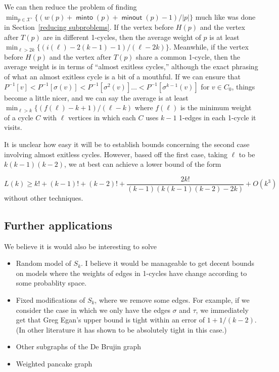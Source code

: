 \documentclass{article}
\DeclareMathOperator{\minto}{\bm{\mathsf{minto}}}
\DeclareMathOperator{\minout}{\bm{\mathsf{minout}}}
\newcommand{\edit}[1]{}%
\begin{document}
We can then reduce the problem of finding $\min_{p \in \mathcal{X}'}\{(w(p)+\minto(p)+\minout(p)-1)/|p|\}$ much like was done in Section~\ref{reducing subproblems}. If the vertex before $H(p)$ and the vertex after $T(p)$ are in different 1-cycles, then the average weight of $p$ is at least $\min_{\ell > 2k} \{(i(\ell)-2(k-1)-1)/(\ell-2k)\} $. Meanwhile, if the vertex before $H(p)$ and the vertex after $T(p)$ share a common 1-cycle, then the average weight is in terms of ``almost exitless cycles,'' although the exact phrasing of what an almost exitless cycle is a bit of a mouthful. If we can ensure that $P^{-1}[v]  <P^{-1}[\sigma(v)] < P^{-1}[\sigma^2(v)] \dots < P^{-1}[\sigma^{k-1}(v)]$ for $v \in C_0$, things become a little nicer, and we can say the average is at least $\min_{\ell > k} \{(f(\ell)-k+1)/(\ell-k)$ where $f(\ell)$ is the minimum weight of a cycle $C$ with $\ell$ vertices in which each $C$ uses $k-1$ 1-edges in each 1-cycle it visits. 

It is unclear how easy it will be to establish bounds concerning the second case involving almost exitless cycles. However, based off the first case, taking $\ell$ to be $k(k-1)(k-2)$, we at best can achieve a lower bound of the form

\[ L(k) \geq k!+(k-1)!+(k-2)! + \frac{2k!}{(k-1)(k(k-1)(k-2)-2k)} + O(k^3)\]
without other techniques.

\subsection{Further applications} \label{further}

We believe it is would also be interesting to solve 

\begin{itemize}
    \item Random model of $S_k$. I believe it would be manageable to get decent bounds on models where the weights of edges in 1-cycles have change according to some probablity space.
    \item Fixed modifications of $S_k$, where we remove some edges. For example, if we consider the case in which we only have the edges $\sigma$ and $\tau$, we immediately get that Greg Egan's upper bound is tight within an error of $1+1/(k-2)$. (In other literature it has shown to be absolutely tight in this case.)\edit{ maybe cite this result}
    \item Other subgraphs of the De Brujin graph
    \item Weighted pancake graph
\end{itemize}
\end{document}
